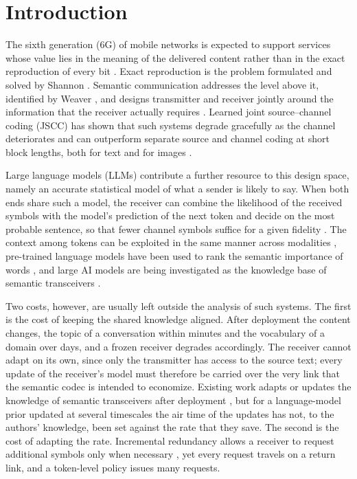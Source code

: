 \section{Introduction}
\label{sec:intro}

The sixth generation (6G) of mobile networks is expected to support services whose value lies in the meaning of the delivered content rather than in the exact reproduction of every bit \cite{itu2023,strinati2021,letaief2019,saad2020}. Exact reproduction is the problem formulated and solved by Shannon \cite{shannon1948}. Semantic communication addresses the level above it, identified by Weaver \cite{weaver1949}, and designs transmitter and receiver jointly around the information that the receiver actually requires \cite{gunduz2023,luo2022,kountouris2021}. Learned joint source--channel coding (JSCC) has shown that such systems degrade gracefully as the channel deteriorates and can outperform separate source and channel coding at short block lengths, both for text \cite{farsad2018,xie2021deepsc} and for images \cite{bourtsoulatze2019,kurka2021}.

Large language models (LLMs) contribute a further resource to this design space, namely an accurate statistical model of what a sender is likely to say. When both ends share such a model, the receiver can combine the likelihood of the received symbols with the model's prediction of the next token and decide on the most probable sentence, so that fewer channel symbols suffice for a given fidelity \cite{wang2024llmsc}. The context among tokens can be exploited in the same manner across modalities \cite{qiao2025token}, pre-trained language models have been used to rank the semantic importance of words \cite{guo2023importance}, and large AI models are being investigated as the knowledge base of semantic transceivers \cite{jiang2024largeai,xie2025largemodel,bariah2024}.

Two costs, however, are usually left outside the analysis of such systems. The first is the cost of keeping the shared knowledge aligned. After deployment the content changes, the topic of a conversation within minutes and the vocabulary of a domain over days, and a frozen receiver degrades accordingly. The receiver cannot adapt on its own, since only the transmitter has access to the source text; every update of the receiver's model must therefore be carried over the very link that the semantic codec is intended to economize. Existing work adapts or updates the knowledge of semantic transceivers after deployment \cite{zhang2023dynamic,zhang2026kbident,zhang2026kbupdate}, but for a language-model prior updated at several timescales the air time of the updates has not, to the authors' knowledge, been set against the rate that they save. The second is the cost of adapting the rate. Incremental redundancy allows a receiver to request additional symbols only when necessary \cite{caire2001,jiang2022harq}, yet every request travels on a return link, and a token-level policy issues many requests.

